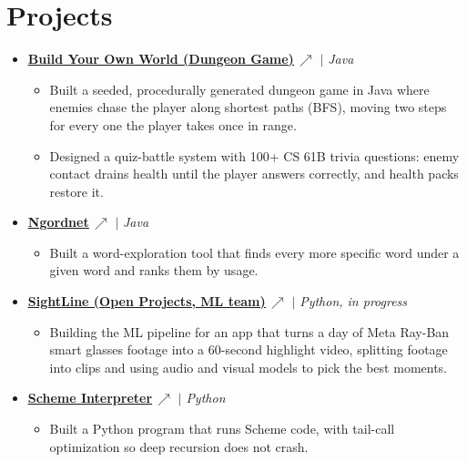 \documentclass[letterpaper,11pt]{article}
\newcommand{\resumeItem}[1]{%
  \item\small{{#1\vspace{-2pt}}}%
}
\newcommand{\resumeProjectHeading}[1]{
    \item\small{{#1 \vspace{-3pt}}}
}
\newcommand{\lk}{\,{\scriptsize$\nearrow$}}
\newcommand{\resumeSubHeadingListStart}{\begin{itemize}[leftmargin=0.0in, label={}]}
\newcommand{\resumeSubHeadingListEnd}{\end{itemize}}
\newcommand{\resumeItemListStart}{\begin{itemize}[itemsep=2.5pt, topsep=3pt]}
\newcommand{\resumeItemListEnd}{\end{itemize}\vspace{-4pt}}
\begin{document}
\section{Projects}
    \vspace{0pt}
    \resumeSubHeadingListStart

         \resumeProjectHeading
            {\textbf{\href{https://github.com/vdkarthikeya/build-your-own-world-public}{\uline{Build Your Own World (Dungeon Game)}}\lk} $|$ \emph{Java}}
        \resumeItemListStart
            \resumeItem{Built a seeded, procedurally generated dungeon game in Java where enemies chase the player along shortest paths (BFS), moving two steps for every one the player takes once in range.}
            \resumeItem{Designed a quiz-battle system with 100+ CS 61B trivia questions: enemy contact drains health until the player answers correctly, and health packs restore it.}
        \resumeItemListEnd
        \vspace{2pt}

        \resumeProjectHeading
            {\textbf{\href{https://github.com/vdkarthikeya/ngordnet-public}{\uline{Ngordnet}}\lk} $|$ \emph{Java}}
        \resumeItemListStart
            \resumeItem{Built a word-exploration tool that finds every more specific word under a given word and ranks them by usage.}
        \resumeItemListEnd
        \vspace{2pt}

        \resumeProjectHeading
            {\textbf{\href{https://github.com/vdkarthikeya/sightline-ml-public}{\uline{SightLine (Open Projects, ML team)}}\lk} $|$ \emph{Python, in progress}}
        \resumeItemListStart
            \resumeItem{Building the ML pipeline for an app that turns a day of Meta Ray-Ban smart glasses footage into a 60-second highlight video, splitting footage into clips and using audio and visual models to pick the best moments.}
        \resumeItemListEnd
        \vspace{2pt}

        \resumeProjectHeading
            {\textbf{\href{https://github.com/vdkarthikeya/scheme-interpreter-public}{\uline{Scheme Interpreter}}\lk} $|$ \emph{Python}}
        \resumeItemListStart
            \resumeItem{Built a Python program that runs Scheme code, with tail-call optimization so deep recursion does not crash.}
        \resumeItemListEnd

    \resumeSubHeadingListEnd
\vspace{-12pt}

\end{document}
